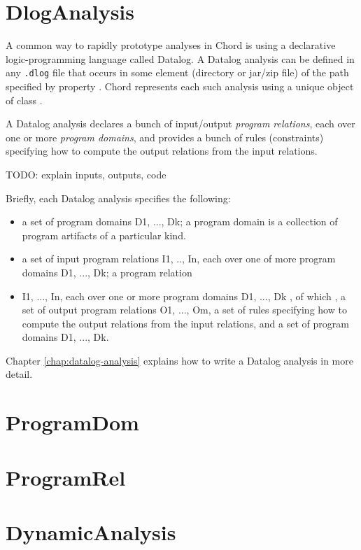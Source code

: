 \section{DlogAnalysis}
\label{sec:dlog-analysis}

A common way to rapidly prototype analyses in Chord is using a declarative
logic-programming language called Datalog.  A Datalog analysis can be defined in
any {\tt .dlog} file that occurs in some element (directory or jar/zip file)
of the path specified by property .  Chord represents each such analysis
using a unique object of class .

A Datalog analysis declares a bunch of input/output {\it program relations},
each over one or more {\it program domains}, and provides a bunch of rules
(constraints) specifying how to compute the output relations from the input
relations.

TODO: explain inputs, outputs, code

Briefly, each Datalog analysis specifies the following:
\begin{itemize}
\item
a set of program domains D1, ..., Dk; a program domain is a collection of program artifacts of a particular kind.
\item
a set of input program relations I1, .., In, each over one of more program domains D1, ..., Dk;
a program relation
\item
I1, ..., In, each over one or more program domains D1, ..., Dk
, of which , a set of output program
relations O1, ..., Om, a set of rules specifying how to compute the output relations from the input
relations, and a set of program domains D1, ..., Dk.  
\end{itemize}

Chapter \ref{chap:datalog-analysis} explains how to write a Datalog analysis in
more detail.

\section{ProgramDom}
\label{sec:program-dom}

\section{ProgramRel}
\label{sec:program-rel}

\section{DynamicAnalysis}
\label{sec:dynamic-analysis}

